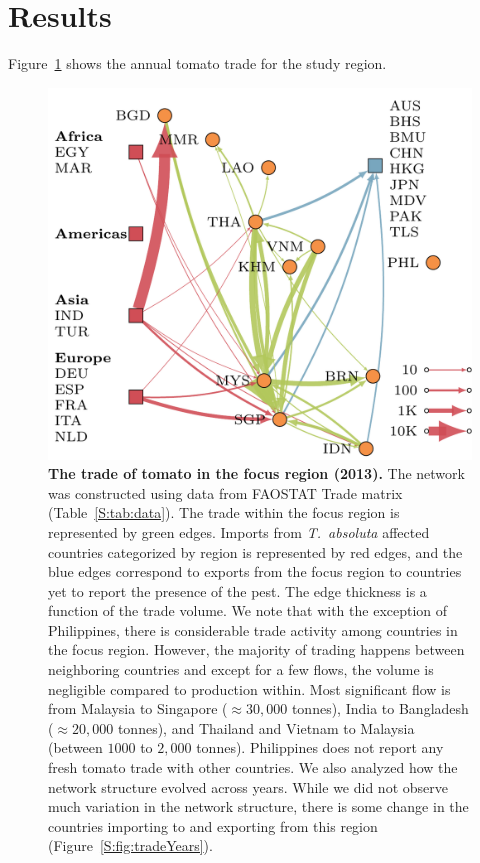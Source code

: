 \documentclass[11pt]{article}
\newcommand{\tuta}{\emph{T.~absoluta}}
\theoremstyle{definition}
\begin{document}
\section{Results}
 Figure~\ref{fig:tomnet} shows the
annual tomato trade for the study region.
\begin{figure}[t]
\centering
\includegraphics[width=.6\textwidth]{../international_trade/results/network_plots/sea_2013_tomato.pdf}
\caption{\textbf{The trade of tomato in the focus region (2013).} The
network was constructed using data from FAOSTAT Trade matrix
(Table~\ref{S:tab:data}).  The trade within the focus region is represented
by green edges. Imports from \tuta{} affected countries categorized by
region is represented by red edges, and the blue edges correspond to
exports from the focus region to countries yet to report the presence of
the pest. The edge thickness is a function of the trade volume. We note
that with the exception of Philippines, there is considerable trade
activity among countries in the focus region. However, the majority of
trading happens between neighboring countries and except for a few flows,
the volume is negligible compared to production within. Most significant
flow is from Malaysia to Singapore ($\approx30,000$ tonnes), India to
Bangladesh ($\approx20,000$ tonnes), and Thailand and Vietnam to Malaysia
(between $1000$ to $2,000$ tonnes). Philippines does not report any fresh
tomato trade with other countries.  We also analyzed how the network
structure evolved across years. While we did not observe much variation in
the network structure, there is some change in the countries importing to
and exporting from this region
(Figure~\ref{S:fig:tradeYears}).\label{fig:tomnet}}
\end{figure}
\end{document}
